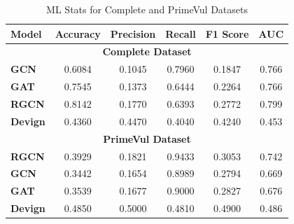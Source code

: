\documentclass{article}
\begin{document}
\begin{table}[h]
    \centering
    \begin{tabular}{|l|c|c|c|c|c|}
        \hline
        \textbf{Model} & Accuracy & Precision & Recall & F1 Score & AUC \\
        \hline
        \multicolumn{6}{|c|}{\textbf{Complete Dataset}} \\
        \hline
        \textbf{GCN}  & 0.6084  & 0.1045  & 0.7960  & 0.1847  & 0.766 \\
        \textbf{GAT}  & 0.7545  & 0.1373  & 0.6444  & 0.2264  & 0.766 \\
        \textbf{RGCN} & 0.8142  & 0.1770  & 0.6393  & 0.2772  & 0.799 \\
        \textbf{Devign} & 0.4360 & 0.4470 & 0.4040 & 0.4240 & 0.453 \\
        \hline
        \multicolumn{6}{|c|}{\textbf{PrimeVul Dataset}} \\
        \hline
        \textbf{RGCN}  & 0.3929  & 0.1821  & 0.9433  & 0.3053  & 0.742 \\
        \textbf{GCN}   & 0.3442  & 0.1654  & 0.8989  & 0.2794  & 0.669 \\
        \textbf{GAT}   & 0.3539  & 0.1677  & 0.9000  & 0.2827  & 0.676 \\
        \textbf{Devign} & 0.4850 & 0.5000 & 0.4810 & 0.4900 & 0.486 \\
        \hline
    \end{tabular}
    \caption{ML Stats for Complete and PrimeVul Datasets}
    \label{tab:performance-metrics}
\end{table}
\end{document}
